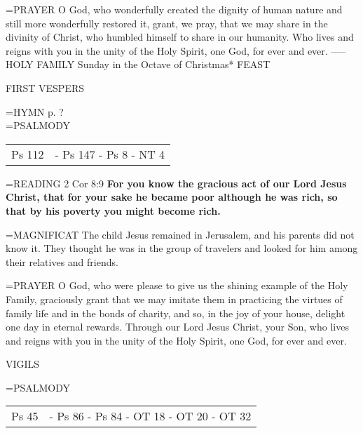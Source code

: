 \hangindent=\parindent \small{PRAYER 	O God, who wonderfully created the dignity of human nature and still more wonderfully restored it, grant, we pray, that we may share in the divinity of Christ, who humbled himself to share in our humanity. Who lives and reigns with you in the unity of the Holy Spirit, one God, for ever and ever.}
-----
HOLY FAMILY
Sunday in the Octave of Christmas*
FEAST

\begin{flushleft}\normalsize FIRST VESPERS\\\end{flushleft}
\hangindent=\parindent \small{\uppercase{HYMN} p.  ?\\}
\hangindent=\parindent \small{PSALMODY}
\begin{center}
\begin{tabular}{ l l }
Ps 112 &  - Ps 147 - Ps 8 - NT 4\\
\end{tabular}
\end{center}		

\hangindent=\parindent \small{READING}    2 Cor 8:9 \textbf{   For you know the gracious act of our Lord Jesus Christ, that for your sake he became poor although he was rich, so that by his poverty you might become rich. \\}

\hangindent=\parindent \small{MAGNIFICAT 	The child Jesus remained in Jerusalem, and his parents did not know it. They thought he was in the group of travelers and looked for him among their relatives and friends.\\}

\hangindent=\parindent \small{PRAYER 	O God, who were please to give us the shining example of the Holy Family, graciously grant that we may imitate them in practicing the virtues of family life and in the bonds of charity, and so, in the joy of your house, delight one day in eternal rewards. Through our Lord Jesus Christ, your Son, who lives and reigns with you in the unity of the Holy Spirit, one God, for ever and ever.}

\begin{flushleft}\normalsize VIGILS\\\end{flushleft}
\hangindent=\parindent \small{PSALMODY}
\begin{center}
\begin{tabular}{ l l }
Ps 45 &  - Ps 86 - Ps 84 - OT 18 - OT 20 - OT 32\\
\end{tabular}
\end{center}		

